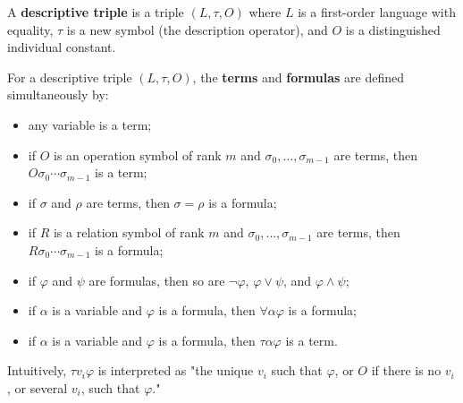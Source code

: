 A \textbf{descriptive triple} is a triple $(L, \tau, O)$ where $L$ is a first-order language with equality, $\tau$ is a new symbol (the description operator), and $O$ is a distinguished individual constant.

For a descriptive triple $(L, \tau, O)$, the \textbf{terms} and \textbf{formulas} are defined simultaneously by:

\begin{itemize}
\item[(i)] any variable is a term;
\item[(ii)] if $O$ is an operation symbol of rank $m$ and $\sigma_0, \ldots, \sigma_{m-1}$ are terms, then $O \sigma_0 \cdots \sigma_{m-1}$ is a term;
\item[(iii)] if $\sigma$ and $\rho$ are terms, then $\sigma = \rho$ is a formula;
\item[(iv)] if $R$ is a relation symbol of rank $m$ and $\sigma_0, \ldots, \sigma_{m-1}$ are terms, then $R \sigma_0 \cdots \sigma_{m-1}$ is a formula;
\item[(v)] if $\varphi$ and $\psi$ are formulas, then so are $\neg \varphi$, $\varphi \lor \psi$, and $\varphi \land \psi$;
\item[(vi)] if $\alpha$ is a variable and $\varphi$ is a formula, then $\forall \alpha \varphi$ is a formula;
\item[(vii)] if $\alpha$ is a variable and $\varphi$ is a formula, then $\tau \alpha \varphi$ is a term.
\end{itemize}

Intuitively, $\tau v_i \varphi$ is interpreted as "the unique $v_i$ such that $\varphi$, or $O$ if there is no $v_i$, or several $v_i$, such that $\varphi$."
